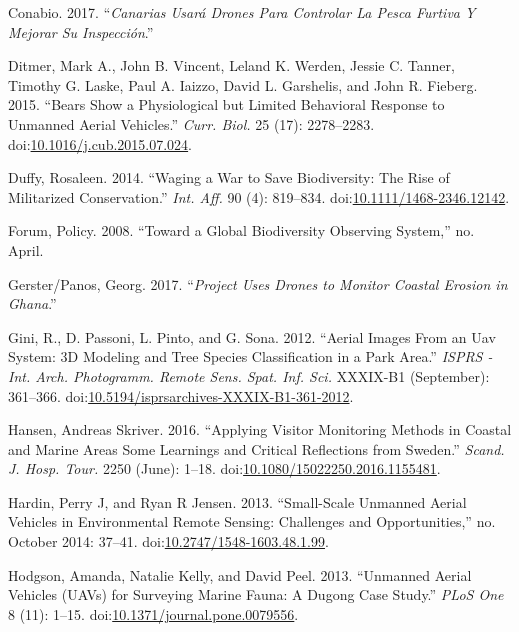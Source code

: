 \documentclass[]{interact}
\theoremstyle{plain}%
\theoremstyle{definition}
\theoremstyle{remark}
\begin{document}
\hypertarget{ref-Conabio2017}{}
Conabio. 2017. ``\emph{Canarias Usará Drones Para Controlar La Pesca
Furtiva Y Mejorar Su Inspección}.''

\hypertarget{ref-ditmer_bears_2015}{}
Ditmer, Mark A., John B. Vincent, Leland K. Werden, Jessie C. Tanner,
Timothy G. Laske, Paul A. Iaizzo, David L. Garshelis, and John R.
Fieberg. 2015. ``Bears Show a Physiological but Limited Behavioral
Response to Unmanned Aerial Vehicles.'' \emph{Curr. Biol.} 25 (17):
2278--2283.
doi:\href{https://doi.org/10.1016/j.cub.2015.07.024}{10.1016/j.cub.2015.07.024}.

\hypertarget{ref-duffy_waging_2014}{}
Duffy, Rosaleen. 2014. ``Waging a War to Save Biodiversity: The Rise of
Militarized Conservation.'' \emph{Int. Aff.} 90 (4): 819--834.
doi:\href{https://doi.org/10.1111/1468-2346.12142}{10.1111/1468-2346.12142}.

\hypertarget{ref-forum_toward_2008}{}
Forum, Policy. 2008. ``Toward a Global Biodiversity Observing System,''
no. April.

\hypertarget{ref-Georg2016}{}
Gerster/Panos, Georg. 2017. ``\emph{Project Uses Drones to Monitor
Coastal Erosion in Ghana}.''

\hypertarget{ref-gini_aerial_2012}{}
Gini, R., D. Passoni, L. Pinto, and G. Sona. 2012. ``Aerial Images From
an Uav System: 3D Modeling and Tree Species Classification in a Park
Area.'' \emph{ISPRS - Int. Arch. Photogramm. Remote Sens. Spat. Inf.
Sci.} XXXIX-B1 (September): 361--366.
doi:\href{https://doi.org/10.5194/isprsarchives-XXXIX-B1-361-2012}{10.5194/isprsarchives-XXXIX-B1-361-2012}.

\hypertarget{ref-hansen_applying_2016}{}
Hansen, Andreas Skriver. 2016. ``Applying Visitor Monitoring Methods in
Coastal and Marine Areas Some Learnings and Critical Reflections from
Sweden.'' \emph{Scand. J. Hosp. Tour.} 2250 (June): 1--18.
doi:\href{https://doi.org/10.1080/15022250.2016.1155481}{10.1080/15022250.2016.1155481}.

\hypertarget{ref-hardin_small-scale_2013}{}
Hardin, Perry J, and Ryan R Jensen. 2013. ``Small-Scale Unmanned Aerial
Vehicles in Environmental Remote Sensing: Challenges and
Opportunities,'' no. October 2014: 37--41.
doi:\href{https://doi.org/10.2747/1548-1603.48.1.99}{10.2747/1548-1603.48.1.99}.

\hypertarget{ref-hodgson_unmanned_2013}{}
Hodgson, Amanda, Natalie Kelly, and David Peel. 2013. ``Unmanned Aerial
Vehicles (UAVs) for Surveying Marine Fauna: A Dugong Case Study.''
\emph{PLoS One} 8 (11): 1--15.
doi:\href{https://doi.org/10.1371/journal.pone.0079556}{10.1371/journal.pone.0079556}.
\end{document}
